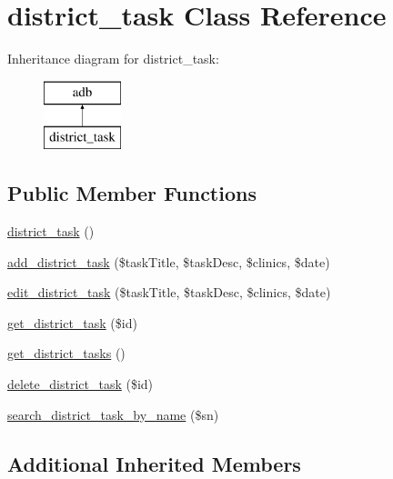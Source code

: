 \hypertarget{classdistrict__task}{}\section{district\+\_\+task Class Reference}
\label{classdistrict__task}
Inheritance diagram for district\+\_\+task\+:\begin{figure}[H]
\begin{center}
\leavevmode
\includegraphics[height=2.000000cm]{classdistrict__task}
\end{center}
\end{figure}
\subsection*{Public Member Functions}
\begin{DoxyCompactItemize}
\item 
\hyperlink{classdistrict__task_aa6df52a05df78a5ae09a39788e1071e5}{district\+\_\+task} ()
\item 
\hyperlink{classdistrict__task_a7f8a58e9eb111390e72c37fc2c2bbb02}{add\+\_\+district\+\_\+task} (\$task\+Title, \$task\+Desc, \$clinics, \$date)
\item 
\hyperlink{classdistrict__task_a57bb08cb00fc42da39aaf1bf5c3f3cfc}{edit\+\_\+district\+\_\+task} (\$task\+Title, \$task\+Desc, \$clinics, \$date)
\item 
\hyperlink{classdistrict__task_af20be466aa484440edca068076620cf9}{get\+\_\+district\+\_\+task} (\$id)
\item 
\hyperlink{classdistrict__task_ab0d0cca77d5247c388a656d55a1d0eef}{get\+\_\+district\+\_\+tasks} ()
\item 
\hyperlink{classdistrict__task_abb85afe56e7c968adfc4467597592058}{delete\+\_\+district\+\_\+task} (\$id)
\item 
\hyperlink{classdistrict__task_a05d70cbbd6521427c616facb7c298f98}{search\+\_\+district\+\_\+task\+\_\+by\+\_\+name} (\$sn)
\end{DoxyCompactItemize}
\subsection*{Additional Inherited Members}


